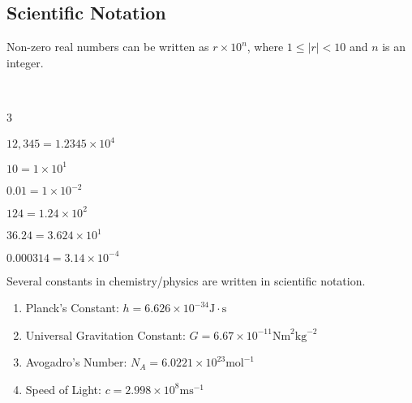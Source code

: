 \documentclass[crop=false,class=book,oneside]{standalone}
\begin{document}
        \subsection{Scientific Notation}
            Non-zero real numbers can be written as
            ${r}\times{10^{n}}$, where ${1}\leq{|r|}<10$
            and $n$ is an integer.
            \begin{example}
                \
                \begin{enumerate}
                \end{enumerate}
            \end{example}
            \begin{remark}
                Several constants in chemistry/physics are
                written in scientific notation.
                \begin{enumerate}
                    \item Planck's Constant:
                        $h={6.626}\times{10^{-34}}%
                        \textrm{J}\cdot\textrm{s}$
                    \item Universal Gravitation Constant:
                        $G={6.67}\times{10^{-11}}%
                        \textrm{Nm}^{2}\textrm{kg}^{-2}$
                    \item Avogadro's Number:
                        $N_{A}={6.0221}\times{10^{23}}%
                        \textrm{mol}^{-1}$
                    \item Speed of Light:
                        $c={2.998}\times{10^{8}\textrm{ms}^{-1}}$
                \end{enumerate}
            \end{remark}
\end{document}
